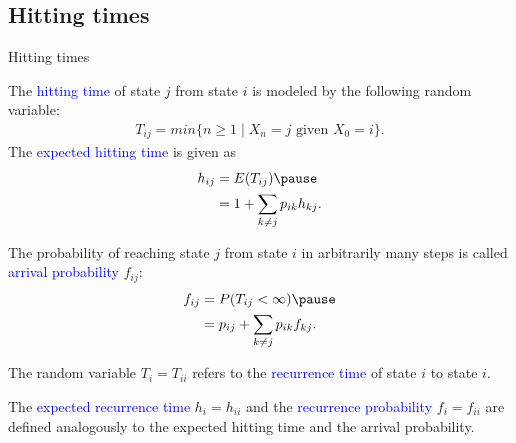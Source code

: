 \documentclass{beamer}
\def\spadding{\vspace{0.25cm}}
\def\b{\textcolor{blue}}
\begin{document}
\subsection{Hitting times}
\begin{frame}{Hitting times}
    \begin{definition}
        The \b{hitting time} of state $j$ from state $i$ is modeled by the following random variable:
        \begin{align*}
            T_{ij} = min \{n \geq 1 \mid X_n = j \text{ given } X_0 = i\}.
        \end{align*}\pause
        The \b{expected hitting time} is given as
        \begin{align*}
            h_{ij} &= E(T_{ij})\pause \\
                   &= 1 + \sum_{k \neq j} p_{ik} h_{kj}.
        \end{align*}
    \end{definition}
\end{frame}

\begin{frame}
    The probability of reaching state $j$ from state $i$ in arbitrarily many steps is called \b{arrival probability} $f_{ij}$:
    \begin{align*}
        f_{ij} &= P(T_{ij} < \infty)\pause \\
               &= p_{ij} + \sum_{k \neq j} p_{ik} f_{kj}.
    \end{align*}\pause
    \begin{definition}
        The random variable $T_i = T_{ii}$ refers to the \b{recurrence time} of state $i$ to state $i$.\pause\par\spadding
        The \b{expected recurrence time} $h_i = h_{ii}$ and the \b{recurrence probability} $f_i = f_{ii}$ are defined analogously to the expected hitting time and the arrival probability.
    \end{definition}
\end{frame}
\end{document}
